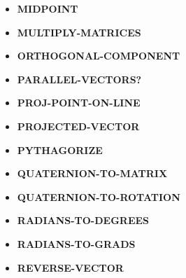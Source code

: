 \documentclass [11pt]{book}
\begin{document}
\begin{itemize}
\item {}
\textbf{MIDPOINT}





\item {}
\textbf{MULTIPLY-MATRICES}





\item {}
\textbf{ORTHOGONAL-COMPONENT}





\item {}
\textbf{PARALLEL-VECTORS?}





\item {}
\textbf{PROJ-POINT-ON-LINE}





\item {}
\textbf{PROJECTED-VECTOR}





\item {}
\textbf{PYTHAGORIZE}





\item {}
\textbf{QUATERNION-TO-MATRIX}





\item {}
\textbf{QUATERNION-TO-ROTATION}





\item {}
\textbf{RADIANS-TO-DEGREES}





\item {}
\textbf{RADIANS-TO-GRADS}





\item {}
\textbf{REVERSE-VECTOR}






\end{itemize}
\end{document}
